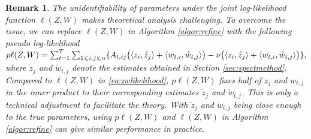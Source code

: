 \documentclass[12pt]{article}
\newcommand{\red}[1]{\textcolor{red}{#1}}
\newtheorem{remark}{Remark}
\begin{document}

\begin{remark} \label{rmk:pseudolik}
The unidentifiability of parameters under  the joint log-likelihood function $ \ell(Z, W)$ makes theoretical analysis challenging. 
To overcome the issue, we can replace $\ell(Z, W)$ in Algorithm \ref{algor:refine} with the following pseudo log-likelihood
 $ p\ell(Z, W) = \sum_{t=1}^T \sum_{1 \leqslant i, j \leqslant n}\{A_{t, i j}\big( \langle z_i, \mathring z_j \rangle + \allowdisplaybreaks \langle w_{t,i}, \mathring w_{t,j}\rangle\big)-\nu \big(\langle z_i, \mathring z_j \rangle + \langle w_{t,i}, \mathring w_{t,j}\rangle\big)\},$
where $\mathring{z}_j$ and $\mathring{w}_{t,j}$ denote the estimates obtained in Section \ref{sec:spectmethod}. 
Compared to $\ell(Z,W)$ in \eqref{eq:zwlikelihood}, $ p\ell(Z, W) $ fixes half of $z_j$ and $w_{t,j}$ in the inner product to their corresponding estimates  $\mathring{z}_j$ and $\mathring{w}_{t,j}$.  
This is only a technical adjustment to facilitate the theory. 
With $\mathring{z}_j$ and $\mathring{w}_{t,j}$ being close enough to the true parameters, using $ p\ell(Z, W)$ and $ \ell(Z, W)$ in Algorithm \ref{algor:refine} can give similar performance in practice. 
\end{remark}
\end{document}
